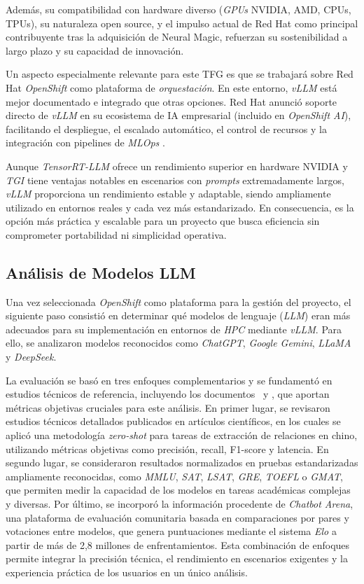 Además, su compatibilidad con hardware diverso (\textit{GPUs} NVIDIA, AMD, CPUs, TPUs), su naturaleza open source, y el impulso actual de Red Hat como principal contribuyente tras la adquisición de Neural Magic, refuerzan su sostenibilidad a largo plazo y su capacidad de innovación.

Un aspecto especialmente relevante para este TFG es que se trabajará sobre Red Hat \textit{OpenShift} como plataforma de \textit{orquestación}. En este entorno, \textit{vLLM} está mejor documentado e integrado que otras opciones. Red Hat anunció soporte directo de \textit{vLLM} en su ecosistema de IA empresarial (incluido en \textit{OpenShift AI}), facilitando el despliegue, el escalado automático, el control de recursos y la integración con pipelines de \textit{MLOps} \cite{ref40}.

Aunque \textit{TensorRT-LLM} ofrece un rendimiento superior en hardware NVIDIA y \textit{TGI} tiene ventajas notables en escenarios con \textit{prompts} extremadamente largos, \textit{vLLM} proporciona un rendimiento estable y adaptable, siendo ampliamente utilizado en entornos reales y cada vez más estandarizado. En consecuencia, es la opción más práctica y escalable para un proyecto que busca eficiencia sin comprometer portabilidad ni simplicidad operativa.

\newpage
\subsection{Análisis de Modelos LLM}
Una vez seleccionada \textit{OpenShift} como plataforma para la gestión del proyecto, el siguiente paso consistió en determinar qué modelos de lenguaje (\textit{LLM}) eran más adecuados para su implementación en entornos de \textit{HPC} mediante \textit{vLLM}. Para ello, se analizaron modelos reconocidos como \textit{ChatGPT}, \textit{Google Gemini}, \textit{LLaMA} y \textit{DeepSeek}.

La evaluación se basó en tres enfoques complementarios y se fundamentó en estudios técnicos de referencia, incluyendo los documentos~\cite{ref41} y \cite{ref16}, que aportan métricas objetivas cruciales para este análisis. En primer lugar, se revisaron estudios técnicos detallados publicados en artículos científicos, en los cuales se aplicó una metodología \textit{zero-shot} para tareas de extracción de relaciones en chino, utilizando métricas objetivas como precisión, recall, F1-score y latencia. En segundo lugar, se consideraron resultados normalizados en pruebas estandarizadas ampliamente reconocidas, como \textit{MMLU}, \textit{SAT}, \textit{LSAT}, \textit{GRE}, \textit{TOEFL} o \textit{GMAT}, que permiten medir la capacidad de los modelos en tareas académicas complejas y diversas. Por último, se incorporó la información procedente de \textit{Chatbot Arena}, una plataforma de evaluación comunitaria basada en comparaciones por pares y votaciones entre modelos, que genera puntuaciones mediante el sistema \textit{Elo} a partir de más de 2,8 millones de enfrentamientos. Esta combinación de enfoques permite integrar la precisión técnica, el rendimiento en escenarios exigentes y la experiencia práctica de los usuarios en un único análisis.

